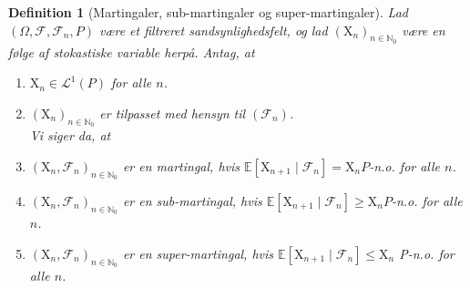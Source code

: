 \documentclass{article}
\newcommand{\1}{\mathbbm{1}}
\theoremstyle{boxed}
\newtheorem{definition}[theorem]{Definition}
\begin{document}
\begin{theorem-box}
    \begin{definition}[Martingaler, sub-martingaler og super-martingaler]
        Lad $\left(\Omega, \mathcal{F}, \mathcal{F}_n, P\right)$ være et filtreret sandsynlighedsfelt, og lad $\left(\mathrm{X}_n\right)_{n \in \mathbb{N}_0}$ være en følge af stokastiske variable herpå. Antag, at
\begin{enumerate}
    \item[(a)] $\mathrm{X}_n \in \mathcal{L}^1(P)$ for alle $n$.
    \item[(b)] $\left(\mathrm{X}_n\right)_{n \in \mathbb{N}_0}$ er tilpasset med hensyn til $\left(\mathcal{F}_n\right)$.
    \\Vi siger da, at
        \item[(c1)] $\left(\mathrm{X}_n, \mathcal{F}_n\right)_{n \in \mathbb{N}_0}$ er en martingal, hvis $\mathbb{E}\left[\mathrm{X}_{n+1} \mid \mathcal{F}_n\right]=\mathrm{X}_n P$-n.o. for alle $n$.
        \item[c2] $\left(\mathrm{X}_n, \mathcal{F}_n\right)_{n \in \mathbb{N}_0}$ er en sub-martingal, hvis $\mathbb{E}\left[\mathrm{X}_{n+1} \mid \mathcal{F}_n\right] \geq \mathrm{X}_n P$-n.o. for alle $n$.
        \item[c3]  $\left(\mathrm{X}_n, \mathcal{F}_n\right)_{n \in \mathbb{N}_0}$ er en super-martingal, hvis $\mathbb{E}\left[\mathrm{X}_{n+1} \mid \mathcal{F}_n\right] \leq \mathrm{X}_n$ P-n.o. for alle $n$.
\end{enumerate}
    \end{definition}
\end{theorem-box}
\end{document}
